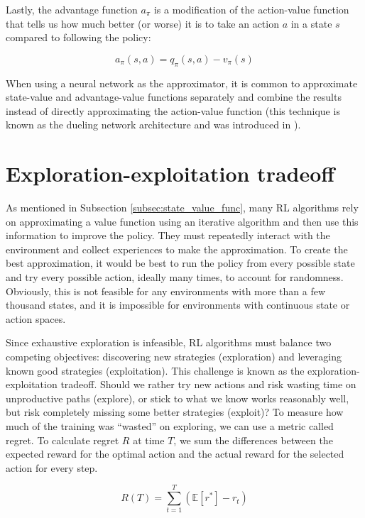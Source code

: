\documentclass[
  digital,     %
  oneside,     %
  nosansbold,  %
  nocolorbold, %
  lof,         %
  lot,         %
]{fithesis4}
\begin{document}
Lastly, the advantage function $a_\pi$ is a modification of the action-value function that tells us how much better (or worse) it is to take an action $a$ in a state $s$ compared to following the policy:

\begin{equation}
a_\pi(s,a) = q_\pi(s,a)-v_\pi(s)
\end{equation}

When using a neural network as the approximator, it is common to approximate state-value and advantage-value functions separately and combine the results instead of directly approximating the action-value function (this technique is known as the dueling network architecture and was introduced in \cite{dueling_arch}).

\section{Exploration-exploitation tradeoff}
\label{sec:eplor-exploit}
As mentioned in Subsection \ref{subsec:state_value_func}, many RL algorithms rely on approximating a value function using an iterative algorithm and then use this information to improve the policy. They must repeatedly interact with the environment and collect experiences to make the approximation. To create the best approximation, it would be best to run the policy from every possible state and try every possible action, ideally many times, to account for randomness. Obviously, this is not feasible for any environments with more than a few thousand states, and it is impossible for environments with continuous state or action spaces.

Since exhaustive exploration is infeasible, RL algorithms must balance two competing objectives: discovering new strategies (exploration) and leveraging known good strategies (exploitation). This challenge is known as the exploration-exploitation tradeoff. Should we rather try new actions and risk wasting time on unproductive paths (explore), or stick to what we know works reasonably well, but risk completely missing some better strategies (exploit)? To measure how much of the training was \enquote{wasted} on exploring, we can use a metric called regret. To calculate regret $R$ at time $T$, we sum the differences between the expected reward for the optimal action and the actual reward for the selected action for every step.

\begin{equation}
R(T) = \sum_{t=1}^{T}(\mathbb{E}[r^*]-r_t)
\end{equation}
\end{document}
